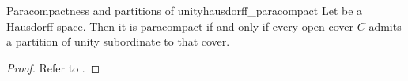 \begin{theorem}{Paracompactness and partitions of unity}{hausdorff_paracompact}
    Let  be a Hausdorff space. Then it is paracompact if and only if every open cover \(C\) admits a partition of unity subordinate to that cover.
\end{theorem}
\begin{proof}
    Refer to \cite{munkres_topology}.
\end{proof}
